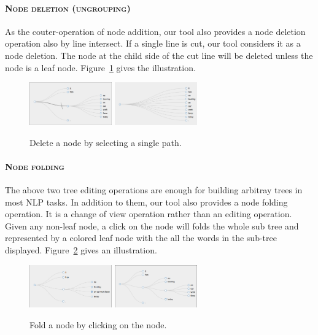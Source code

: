 \paragraph{\textsc{Node deletion (ungrouping)}\\}

As the couter-operation of node addition, our tool also provides a
node deletion operation also by line intersect. If a single line is
cut, our tool considers it as a node deletion. The node at the child
side of the cut line will be deleted unless the node is a leaf node.
Figure~\ref{fig:node_deletion.png} gives the illustration.

\begin{figure}
\centering
\includegraphics[width=1.4in]{figs/node_deletion_before.png}
\includegraphics[width=1.4in]{figs/node_deletion_after.png}
\caption{Delete a node by selecting a single path.}
\label{fig:node_deletion.png}
\end{figure}



\paragraph{\textsc{Node folding}\\}

The above two tree editing operations are enough for building arbitray
trees in most NLP tasks. In addition to them, our tool also provides a
node folding operation. It is a change of view operation rather than
an editing operation. Given any non-leaf node, a click on the node
will folds the whole sub tree and represented by a colored leaf node
with the all the words in the sub-tree displayed.
Figure~\ref{fig:folding.png}  gives an illustration.

\begin{figure}
\centering
\includegraphics[width=1.4in]{figs/collapse_after.png}
\includegraphics[width=1.4in]{figs/collapse_before.png}
\caption{Fold a node by clicking on the node.}
\label{fig:folding.png}
\end{figure}


